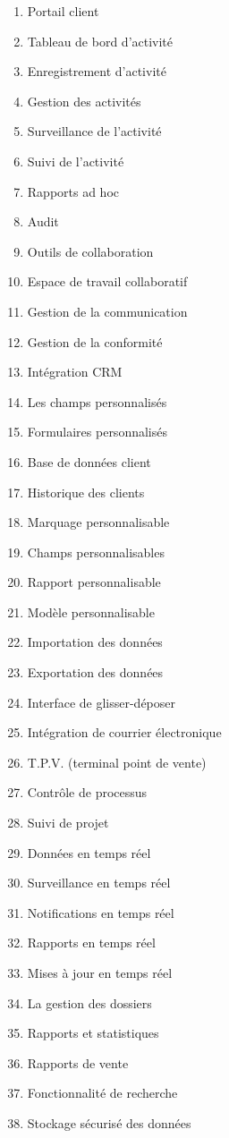 \begin{enumerate}
\item Portail client
\item Tableau de bord d'activité
\item Enregistrement d'activité
\item Gestion des activités
\item Surveillance de l'activité
\item Suivi de l'activité
\item Rapports ad hoc
\item Audit
\item Outils de collaboration
\item Espace de travail collaboratif
\item Gestion de la communication
\item Gestion de la conformité
\item Intégration CRM
\item Les champs personnalisés
\item Formulaires personnalisés
\item Base de données client
\item Historique des clients
\item Marquage personnalisable
\item Champs personnalisables
\item Rapport personnalisable
\item Modèle personnalisable
\item Importation des données
\item Exportation des données
\item Interface de glisser-déposer
\item Intégration de courrier électronique
\item T.P.V. (terminal point de vente) 
\item Contrôle de processus
\item Suivi de projet
\item Données en temps réel
\item Surveillance en temps réel
\item Notifications en temps réel
\item Rapports en temps réel
\item Mises à jour en temps réel
\item La gestion des dossiers
\item Rapports et statistiques
\item Rapports de vente
\item Fonctionnalité de recherche
\item Stockage sécurisé des données

\end{enumerate}
